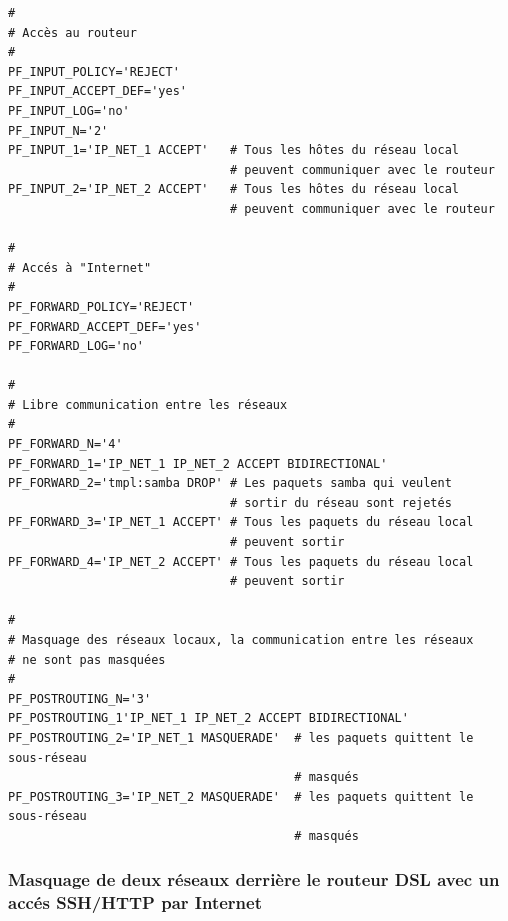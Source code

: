 \begin{example}
\begin{verbatim}
#
# Accès au routeur
#
PF_INPUT_POLICY='REJECT'
PF_INPUT_ACCEPT_DEF='yes'
PF_INPUT_LOG='no'
PF_INPUT_N='2'
PF_INPUT_1='IP_NET_1 ACCEPT'   # Tous les hôtes du réseau local
                               # peuvent communiquer avec le routeur
PF_INPUT_2='IP_NET_2 ACCEPT'   # Tous les hôtes du réseau local
                               # peuvent communiquer avec le routeur

#
# Accés à "Internet"
#
PF_FORWARD_POLICY='REJECT'
PF_FORWARD_ACCEPT_DEF='yes'
PF_FORWARD_LOG='no'

#
# Libre communication entre les réseaux
#
PF_FORWARD_N='4'
PF_FORWARD_1='IP_NET_1 IP_NET_2 ACCEPT BIDIRECTIONAL'
PF_FORWARD_2='tmpl:samba DROP' # Les paquets samba qui veulent
                               # sortir du réseau sont rejetés
PF_FORWARD_3='IP_NET_1 ACCEPT' # Tous les paquets du réseau local
                               # peuvent sortir
PF_FORWARD_4='IP_NET_2 ACCEPT' # Tous les paquets du réseau local
                               # peuvent sortir

#
# Masquage des réseaux locaux, la communication entre les réseaux
# ne sont pas masquées
#
PF_POSTROUTING_N='3'
PF_POSTROUTING_1'IP_NET_1 IP_NET_2 ACCEPT BIDIRECTIONAL'
PF_POSTROUTING_2='IP_NET_1 MASQUERADE'  # les paquets quittent le sous-réseau
                                        # masqués
PF_POSTROUTING_3='IP_NET_2 MASQUERADE'  # les paquets quittent le sous-réseau
                                        # masqués
\end{verbatim}
\end{example}

\subsubsection{Masquage de deux réseaux derrière le routeur DSL
avec un accés SSH/HTTP par Internet}

